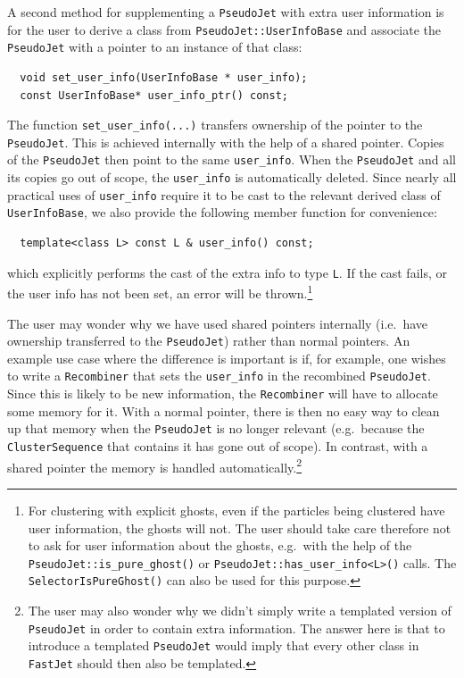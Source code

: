 \documentclass[12pt,a4]{article}
\newcommand{\fastjet}{\texttt{FastJet}\xspace}
\newcommand{\ttt}[1]{{\small\texttt{#1}}}
\newcommand{\PJ}{\ttt{PseudoJet}\xspace}
\newcommand{\CS}{\ttt{ClusterSequence}\xspace}
\begin{document}
A second method for supplementing a \PJ with extra user information is for
the user to derive a class from \ttt{PseudoJet::UserInfoBase} and
associate the \ttt{PseudoJet} with a pointer to an instance of that
class:
\begin{lstlisting}
  void set_user_info(UserInfoBase * user_info);
  const UserInfoBase* user_info_ptr() const;
\end{lstlisting}
The function \ttt{set\_user\_info(...)} transfers ownership of the
pointer to the \ttt{PseudoJet}. 
%
This is achieved internally with the help of a shared pointer. Copies
of the \ttt{PseudoJet} then point to the same \ttt{user\_info}.
%
When the \ttt{PseudoJet} and all its copies go out of scope, the
\ttt{user\_info} is automatically deleted.
%
Since nearly all practical uses of \ttt{user\_info} require it
to be cast to the relevant derived class of  \ttt{UserInfoBase}, we also
provide the following member function for convenience:
\begin{lstlisting}
  template<class L> const L & user_info() const;
\end{lstlisting}
which explicitly performs the cast of the extra info to type \ttt{L}.
%
If the cast fails, or the user info has not been set, an error
will be thrown.\footnote{%
  For clustering with explicit ghosts, even if the particles being
  clustered have user information, the ghosts will not. 
  The user should take care therefore not to ask for user information
  about the ghosts, e.g.\ with the help of the \texttt{PseudoJet::is\_pure\_ghost()}
  or \texttt{PseudoJet::has\_user\_info<L>()} calls.
  The \texttt{SelectorIsPureGhost()} can also be used for this purpose.
}

The user may wonder why we have used shared pointers internally (i.e.\
have ownership transferred to the \ttt{PseudoJet}) rather than normal
pointers.
%
An example use case where the difference is important is if, for
example, one wishes to write a \ttt{Recombiner} that sets the
\ttt{user\_info} in the recombined \PJ.
%
Since this is likely to be new information, the \ttt{Recombiner} will
have to allocate some memory for it. 
%
With a normal pointer, there is then no easy way to clean up that
memory when the \PJ is no longer relevant (e.g.\ because the \CS that
contains it has gone out of scope). 
%
In contrast, with a shared pointer the memory is handled automatically.\footnote{
  The user may also wonder why we didn't simply write a templated
  version of \PJ in order to contain extra information.
  The answer here is that to introduce a templated \PJ would imply
  that every other class in \fastjet should then also be templated. 
}
\end{document}
